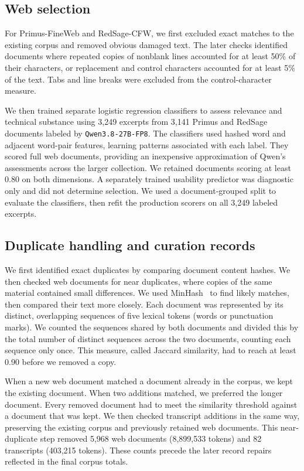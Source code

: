 \documentclass[10pt,twocolumn]{article}
\begin{document}
\subsection{Web selection}

For Primus-FineWeb and RedSage-CFW, we first excluded exact matches to the
existing corpus and removed obvious damaged text. The later checks
identified documents where repeated copies of nonblank lines accounted for
at least 50\% of their characters, or replacement and control characters
accounted for at least 5\% of the text. Tabs and line breaks were excluded
from the control-character measure.

We then trained separate logistic regression classifiers to assess relevance
and technical substance using 3,249 excerpts from 3,141 Primus and RedSage
documents labeled by \texttt{Qwen3.8-27B-FP8}. The classifiers used hashed word and adjacent
word-pair features, learning patterns associated with each label. They
scored full web documents, providing an inexpensive approximation of Qwen's
assessments across the larger collection. We retained documents scoring at
least 0.80 on both dimensions. A separately trained usability predictor was
diagnostic only and did not determine selection. We used a document-grouped
split to evaluate the classifiers, then refit the production scorers on
all 3,249 labeled excerpts.



\subsection{Duplicate handling and curation records}

We first identified exact duplicates by comparing document content hashes. We
then checked web documents for near duplicates, where copies of the same
material contained small differences. We used MinHash~\cite{broder} to find
likely matches, then compared their text more closely. Each document was
represented by its distinct, overlapping sequences of five lexical tokens
(words or punctuation marks). We counted the sequences shared by both
documents and divided this by the total number of distinct sequences across
the two documents, counting each sequence only once. This measure, called
Jaccard similarity, had to reach at least 0.90 before we removed a copy.

When a new web document matched a document already in the corpus, we kept
the existing document. When two additions matched, we preferred the longer
document. Every removed document had to meet the similarity threshold
against a document that was kept. We then checked transcript additions in
the same way, preserving the existing corpus and previously retained web
documents. This near-duplicate step removed 5,968 web documents
(8,899,533 tokens) and 82 transcripts (403,215 tokens). These counts precede
the later record repairs reflected in the final corpus totals.
\end{document}

